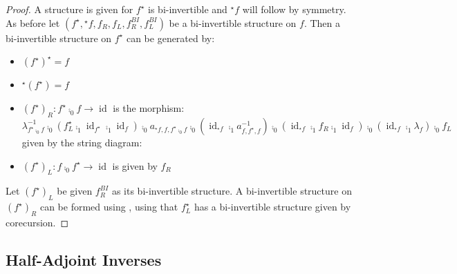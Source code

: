 \documentclass[draft]{article}
\DeclareMathOperator{\id}{id}
\newcommand{\linv}[1]{{}^\star\!#1} \newcommand{\rinv}[1]{#1^\star}
\begin{document}
\begin{proof}
  A structure is given for \(\rinv f\) is bi-invertible and \(\linv
  f\) will follow by symmetry. As before let \((\rinv f, \linv f, f_R,
  f_L, f_R^{BI}, f_L^{BI})\) be a bi-invertible structure on \(f\).
  Then a bi-invertible structure on \(\rinv f\) can be generated by:
  \begin{itemize}
  \item \(\rinv {(\rinv f)} = f\)
  \item \(\linv {(\rinv f)} = f\)
  \item \({(\rinv f)}_R: \rinv f \comp_0 f \to \id\) is the morphism:
    \begin{equation*}
      \lambda_{\rinv f \comp_0 f}^{-1} \comp_0 (\rinv {f_L} \comp_1 \id_{\rinv f} \comp_1 \id_f) \comp_0 a_{\linv f, f, \rinv f \comp_0 f} \comp_0 (\id_{\linv f} \comp_1 a_{f, \rinv f, f}^{-1}) \comp_0 (\id_{\linv f} \comp_1 f_R \comp_1 \id_f) \comp_0 (\id_{\linv f} \comp_1 \lambda_f) \comp_0 f_L
    \end{equation*}
    given by the string diagram:
    \begin{center}
    \end{center}
  \item \({(\rinv f)}_L: f \comp_0 \rinv f \to \id\) is given by
    \(f_R\)
  \end{itemize}
  Let \({(\rinv f)}_L\) be given \(f_R^{BI}\) as its bi-invertible
  structure. A bi-invertible structure on \({(\rinv f)}_R\) can be
  formed using , using that \(\rinv {f_L}\)
  has a bi-invertible structure given by corecursion.
\end{proof}

\subsection{Half-Adjoint Inverses}\label{sec:hai}
\end{document}

